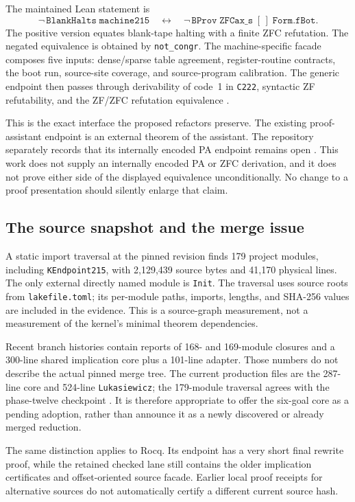 \documentclass[11pt,letterpaper]{article}
\newcommand{\code}[1]{\texttt{#1}}
\begin{document}
The maintained Lean statement is
\[
  \neg\,\code{BlankHalts}\;\code{machine215}
  \quad\longleftrightarrow\quad
  \neg\,\code{BProv}\;\code{ZFCax\_s}\;[\,]\;\code{Form.fBot}.
\]
The positive version equates blank-tape halting with a finite ZFC refutation.
The negated equivalence is obtained by \code{not\_congr}. The machine-specific
facade composes five inputs: dense/sparse table agreement, register-routine contracts,
the boot run, source-site coverage, and source-program calibration. The generic
endpoint then passes through derivability of code~1 in \code{C222}, syntactic ZF
refutability, and the ZF/ZFC refutation equivalence \cite{endpoint,genericendpoint}.

This is the exact interface the proposed refactors preserve. The existing proof-assistant
endpoint is an external theorem of the assistant. The repository separately records
that its internally encoded PA endpoint remains open \cite{phase12}. This work does
not supply an internally encoded PA or ZFC derivation, and it does not prove either
side of the displayed equivalence unconditionally. No change to a proof presentation
should silently enlarge that claim.

\subsection{The source snapshot and the merge issue}

A static import traversal at the pinned revision finds 179 project modules, including
\code{KEndpoint215}, with 2,129,439 source bytes and 41,170 physical lines. The only
external directly named module is \code{Init}. The traversal uses source roots from
\code{lakefile.toml}; its per-module paths, imports, lengths, and SHA-256 values are
included in the evidence. This is a source-graph measurement, not a measurement of
the kernel's minimal theorem dependencies.

Recent branch histories contain reports of 168- and 169-module closures and a
300-line shared implication core plus a 101-line adapter. Those numbers do not describe
the actual pinned merge tree. The current production files are the 287-line core and
524-line \code{Lukasiewicz}; the 179-module traversal agrees with the phase-twelve
checkpoint \cite{phase12}. It is therefore appropriate to offer the six-goal core as
a pending adoption, rather than announce it as a newly discovered or already merged
reduction.

The same distinction applies to Rocq. Its endpoint has a very short final rewrite
proof, while the retained checked lane still contains the older implication certificates
and offset-oriented source facade. Earlier local proof receipts for alternative sources
do not automatically certify a different current source hash.
\end{document}
